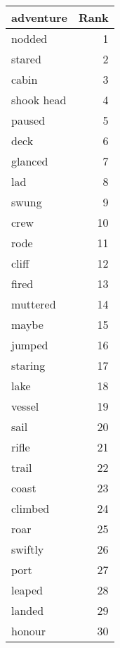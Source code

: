 \begin{table}
\label{tab:adventure_terms}
\begin{tabular}{lr}
\toprule
adventure & Rank \\
\midrule
nodded & 1 \\
stared & 2 \\
cabin & 3 \\
shook head & 4 \\
paused & 5 \\
deck & 6 \\
glanced & 7 \\
lad & 8 \\
swung & 9 \\
crew & 10 \\
rode & 11 \\
cliff & 12 \\
fired & 13 \\
muttered & 14 \\
maybe & 15 \\
jumped & 16 \\
staring & 17 \\
lake & 18 \\
vessel & 19 \\
sail & 20 \\
rifle & 21 \\
trail & 22 \\
coast & 23 \\
climbed & 24 \\
roar & 25 \\
swiftly & 26 \\
port & 27 \\
leaped & 28 \\
landed & 29 \\
honour & 30 \\
\bottomrule
\end{tabular}
\end{table}
